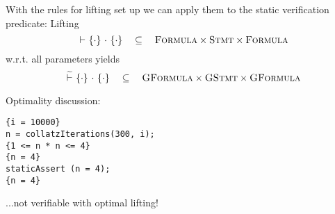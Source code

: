 With the rules for lifting set up we can apply them to the static verification predicate:
Lifting 
$${~} \,\,{\vdash}\,\, \{{\cdot}\} ~{\cdot}~ \{{\cdot}\} ~~~\subseteq~~~ \textsc{Formula} \times \textsc{Stmt} \times \textsc{Formula}$$
w.r.t. all parameters yields
$${~} \,\,\widetilde{\vdash}\,\, \{{\cdot}\} ~{\cdot}~ \{{\cdot}\} ~~~\subseteq~~~ \textsc{GFormula} \times \textsc{GStmt} \times \textsc{GFormula}$$

Optimality discussion:
\begin{verbatim}
{i = 10000}
n = collatzIterations(300, i);
{1 <= n * n <= 4}
{n = 4}
staticAssert (n = 4);
{n = 4}
\end{verbatim}
...not verifiable with optimal lifting!






